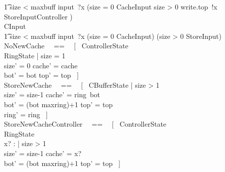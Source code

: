 \documentclass{article}
\begin{document}
\begin{circus}

        \t1 \lcircguard size < maxbuff \rcircguard \circguard input~?x \then
            (\lcircguard size = 0 \rcircguard \circguard CacheInput
            \extchoice
             \lcircguard size > 0 \rcircguard \circguard write.top~!x \then StoreInputController
            ) \\
    CInput \circdef \\
        \t1 \lcircguard size < maxbuff \rcircguard \circguard input~?x \then
            (\lcircguard size = 0 \rcircguard \circguard CacheInput)
            \extchoice
            (\lcircguard size > 0 \rcircguard \circguard StoreInput) \\
    NoNewCache ~~==~~ [~ \Delta ControllerState
            \\%
            \Xi RingState
        |
            size = 1
            \\%
            size' = 0 \land cache' = cache
            \\%
            bot' = bot \land top' = top ~] \\
    StoreNewCache ~~==~~ [~ \Delta CBufferState
        |
            size > 1
            \\
            size' = size-1 \land cache' = ring~bot
            \\
            bot' = (bot \mod maxring)+1 \land top' = top
            \\
            ring' = ring ~] \\
    StoreNewCacheController ~~==~~ [~     \Delta ControllerState
            \\%
            \Xi RingState
            \\%
            x? : \nat
        |
            size > 1
            \\%
            size' = size-1 \land cache' = x?
            \\%
            bot' = (bot \mod maxring)+1 \land top' = top ~] \\

\end{circus}
\end{document}
